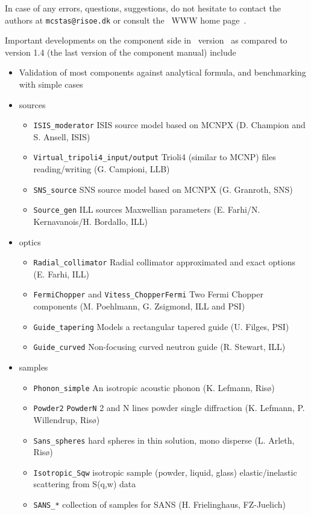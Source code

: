 In case of any errors, questions, suggestions,
do not hesitate to
contact the authors at \verb+mcstas@risoe.dk+
or consult the \MCS\ WWW home page~\cite{mcstas_webpage}.

Important developments on the component side in \MCS\ version \version\
as compared to version 1.4 (the last version of the component manual) include

\begin{itemize}
\item{Validation of most components against analytical formula, and benchmarking with simple cases}
\item{sources}
  \begin{itemize}
  \item \verb+ISIS_moderator+ ISIS source model based on MCNPX (D. Champion and S. Ansell, ISIS)
  \item \verb+Virtual_tripoli4_input/output+ Trioli4 (similar to MCNP) files reading/writing (G. Campioni, LLB)
  \item \verb+SNS_source+ SNS source model based on MCNPX (G. Granroth, SNS)
  \item \verb+Source_gen+ ILL sources Maxwellian parameters (E. Farhi/N. Kernavanois/H. Bordallo, ILL)
  \end{itemize}
\item{optics}
  \begin{itemize}
  \item \verb+Radial_collimator+ Radial collimator approximated and exact options (E. Farhi, ILL)
  \item \verb+FermiChopper+ and \verb+Vitess_ChopperFermi+ Two Fermi Chopper components (M. Poehlmann, G. Zsigmond, ILL and PSI)
  \item \verb+Guide_tapering+ Models a rectangular tapered guide (U. Filges, PSI)
  \item \verb+Guide_curved+  Non-focusing curved neutron guide (R. Stewart, ILL)
  \end{itemize}
\item{samples}
  \begin{itemize}
  \item \verb+Phonon_simple+ An isotropic acoustic phonon (K. Lefmann, Ris\o)
  \item \verb+Powder2+ \verb+PowderN+ 2 and N lines powder single diffraction (K. Lefmann, P. Willendrup, Ris\o)
  \item \verb+Sans_spheres+ hard spheres in thin solution, mono disperse (L. Arleth, Ris\o)
  \item \verb+Isotropic_Sqw+ isotropic sample (powder, liquid, glass) elastic/inelastic scattering from S(q,w) data
  \item \verb+SANS_*+ collection of samples for SANS (H. Frielinghaus,  FZ-Juelich)
  \end{itemize}
\end{itemize}

